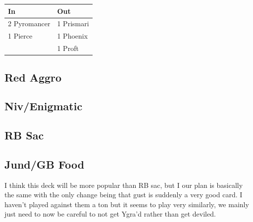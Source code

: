 \documentclass[12pt]{article}
\begin{document}
\begin{center}
    \begin{tabular}{|l|l|}
        \hline
        In           & Out        \\
        \hline
        2 Pyromancer & 1 Prismari \\
        1 Pierce     & 1 Phoenix  \\
                     & 1 Proft    \\
        \hline
    \end{tabular}
\end{center}

\subsection{Red Aggro}

\subsection{Niv/Enigmatic}

\subsection{RB Sac}

\subsection{Jund/GB Food}
I think this deck will be more popular than RB sac, but I our plan is basically the same with the only change being that gust is suddenly a very good card. I haven't played against them a ton but it seems to play very similarly, we mainly just need to now be careful to not get Ygra'd rather than get deviled.
\end{document}

